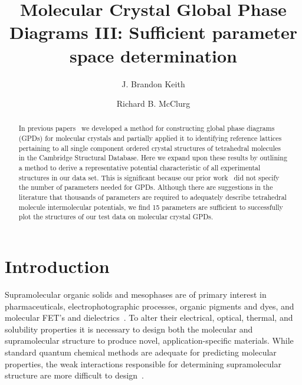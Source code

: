 \documentclass[preprint]{revtex4}
\begin{document}
\title{Molecular Crystal Global Phase Diagrams III: Sufficient parameter space determination}

\author{J. Brandon Keith}
\author{Richard B. McClurg}


\begin{abstract}
In previous papers~\cite{Mettes04,McClurg08} we developed a method
for constructing global phase diagrams (GPDs) for molecular crystals
and partially applied it to identifying reference lattices
pertaining to all single component ordered crystal structures of
tetrahedral molecules in the Cambridge Structural Database. Here we
expand upon these results by outlining a method to derive a
representative potential characteristic of all experimental
structures in our data set. This is significant because our prior
work~\cite{Mettes04} did not specify the number of parameters needed
for GPDs. Although there are suggestions in the literature that
thousands of parameters are required to adequately describe
tetrahedral molecule intermolecular potentials, we
find 15 parameters are sufficient to successfully plot the
structures of our test data on molecular crystal GPDs.
\end{abstract}

\maketitle

\section{Introduction}

Supramolecular organic solids and mesophases are of primary interest
in pharmaceuticals, electrophotographic processes, organic pigments
and dyes, and molecular FET's and dielectrics~\cite{Bassoul00}. To
alter their electrical, optical, thermal, and solubility properties
it is necessary to design both the molecular and supramolecular
structure to produce novel, application-specific materials. While
standard quantum chemical methods are adequate for predicting
molecular properties, the weak interactions responsible for
determining supramolecular structure are more difficult to
design~\cite{Lommerse00,Motherwell02}.
\end{document}
